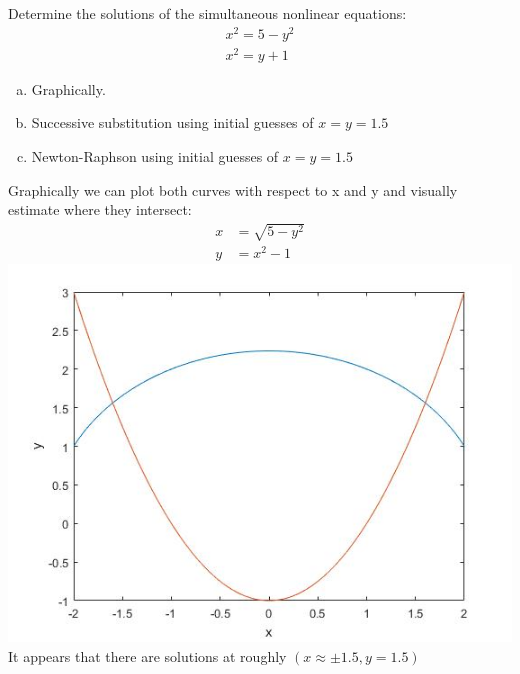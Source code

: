 \documentclass{article}
\begin{document}
\setcounter{problem}{8}
\begin{problem}
Determine the solutions of the simultaneous nonlinear equations:\\
\[ 
\begin{matrix}
x^{2} = 5-y^{2}\\
x^{2} = y+1
\end{matrix}
\]
\begin{enumerate}[(a)]
\item Graphically.
\item Successive substitution using initial guesses of $x=y=1.5$
\item Newton-Raphson using initial guesses of $x=y=1.5$
\end{enumerate}
\end{problem}

\begin{solution}
Graphically we can plot both curves with respect to x and y and visually estimate where they intersect:\\
\begin{align*}
x&=\sqrt{5-y^{2}}\\
y&=x^{2}-1
\end{align*}
\includegraphics[width=\linewidth]{HW8-NonlinearGraph.jpg}
It appears that there are solutions at roughly $(x\approx\pm 1.5,y=1.5)$
\end{solution}
\end{document}
